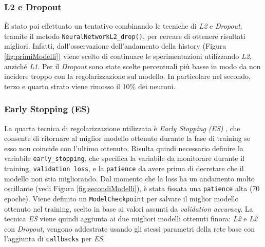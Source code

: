 
\subsubsection{L2 e Dropout}
È stato poi effettuato un tentativo combinando le tecniche di \textit{L2} e \textit{Dropout}, tramite il metodo \texttt{NeuralNetworkL2\_drop()}, per cercare di ottenere risultati migliori. 
Infatti, dall'osservazione dell'andamento della history (Figura \ref{fig:primiModelli}) viene scelto di continuare le sperimentazioni utilizzando \textit{L2}, anziché \textit{L1}.
Per il \textit{Dropout} sono state scelte percentuali più basse in modo da non incidere troppo con la regolarizzazione sul modello. In particolare nel secondo, terzo e quarto strato viene rimosso il 10\% dei neuroni.


\subsubsection{Early Stopping (ES)}
La quarta tecnica di regolarizzazione utilizzata è \textit{Early Stopping} \textit{(ES)} \cite{machinelearningmasteryEarlyStopping}, che consente di ritornare al miglior modello ottenuto durante la fase di training se esso non coincide con l'ultimo ottenuto.
Risulta quindi necessario definire la variabile \texttt{early\_stopping}, che specifica la variabile da monitorare durante il training, \texttt{validation loss}, e la \texttt{patience} da avere prima di decretare che il modello non stia migliorando. 
Dal momento che la loss ha un andamento molto oscillante (vedi Figura \ref{fig:secondiModelli}), è stata fissata una \texttt{patience} alta (70 epoche). Viene definito un \texttt{ModelCheckpoint} per salvare il miglior modello ottenuto nel training, scelto in base ai valori assunti da \textit{validation accuracy}. 
La tecnica \textit{ES} viene quindi aggiunta ai due migliori modelli ottenuti finora: \textit{L2} e \textit{L2} con \textit{Dropout}, vengono addestrate usando gli stessi parametri della rete base con l'aggiunta di \texttt{callbacks} per \textit{ES}.

